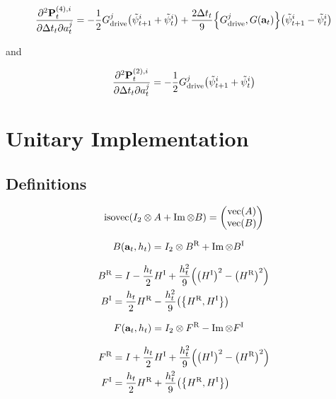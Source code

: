\documentclass{article}
\newcommand{\isopsi}{\tilde \psi}
\newcommand{\isovec}{\text{isovec}}
\newcommand{\HI}{H^{\text{I}}}
\newcommand{\HR}{H^{\text{R}}}
\newcommand{\BR}{B^{\text{R}}}
\newcommand{\BI}{B^{\text{I}}}
\newcommand{\FR}{F^{\text{R}}}
\newcommand{\FI}{F^{\text{I}}}
\begin{document}
\begin{equation}
  \pdv{\vb{P}_t^{(4),i}}{\Delta t_t}{a^j_t} 
    = -\frac{1}{2} G^j_{\text{drive}} \qty(\isopsi^i_{t+1} + \isopsi^i_{t}) 
    + \frac{2 \Delta t_t}{9} \qty{G^j_{\text{drive}}, G(\vb{a}_t)}\qty(\isopsi^i_{t+1} - \isopsi^i_{t})
\end{equation}

and


\begin{equation}
  \pdv{\vb{P}_t^{(2),i}}{\Delta t_t}{a^j_t} 
    = -\frac{1}{2} G^j_{\text{drive}} \qty(\isopsi^i_{t+1} + \isopsi^i_{t}) 
\end{equation}

\newpage

\section{Unitary Implementation}

\subsection{Definitions}

\begin{equation*}
  \isovec\qty(I_2 \otimes A + \Im \otimes B) = \mqty(\text{vec}(A) \\ \text{vec}(B))
\end{equation*}

\begin{align*}
  B(\vb{a}_t, h_t) &= I_2 \otimes \BR + \Im \otimes \BI 
\end{align*}

\begin{align*}
  \BR &= I - \frac{h_t}{2} \HI + \frac{h_t^2}{9}\qty(\qty(\HI)^2 - \qty(\HR)^2) \\
  \BI &= \frac{h_t}{2} \HR - \frac{h_t^2}{9}\qty(\qty{\HR,\HI})
\end{align*}

\begin{align*}
  F(\vb{a}_t, h_t) &= I_2 \otimes \FR - \Im \otimes \FI
\end{align*}

\begin{align*}
  \FR &= I + \frac{h_t}{2} \HI + \frac{h_t^2}{9}\qty(\qty(\HI)^2 - \qty(\HR)^2) \\
  \FI &= \frac{h_t}{2} \HR + \frac{h_t^2}{9}\qty(\qty{\HR,\HI})
\end{align*}
\end{document}
